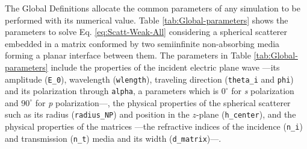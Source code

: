 The Global Definitions allocate the common parameters of any simulation to be performed with its numerical value. Table \ref{tab:Global-parameters} shows the parameters to solve Eq. \eqref{eq:Scatt-Weak-All} considering a spherical scatterer embedded in a matrix conformed by two semiinfinite non-absorbing media forming a planar interface between them. The parameters in Table \ref{tab:Global-parameters} include the properties of the incident electric plane wave ---its amplitude (\lstinline!E_0!),  wavelength (\lstinline!wlength!), traveling direction (\lstinline!theta_i! and \lstinline!phi!) and its polarization through \lstinline!alpha!, a parameters which is $0^\circ$ for \textit{s} polarization and $90^\circ$ for \textit{p} polarization---, the physical properties of the spherical scatterer such as its radius  (\lstinline!radius_NP!) and position in the $z$-plane (\lstinline!h_center!), and the physical properties of the matrices ---the refractive indices of the incidence (\lstinline!n_i!) and transmission (\lstinline!n_t!) media and its width (\lstinline!d_matrix!)---.

